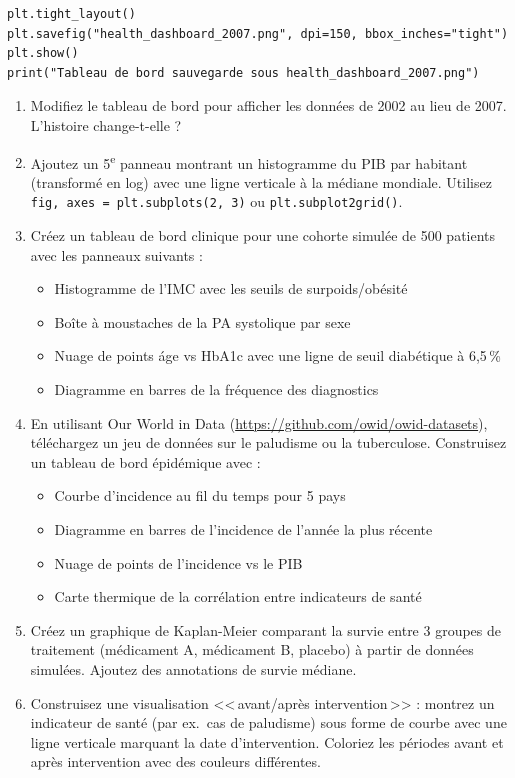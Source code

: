 \begin{verbatim}
plt.tight_layout()
plt.savefig("health_dashboard_2007.png", dpi=150, bbox_inches="tight")
plt.show()
print("Tableau de bord sauvegarde sous health_dashboard_2007.png")
\end{verbatim}

\begin{exercise}
\begin{enumerate}
  \item Modifiez le tableau de bord pour afficher les donn\'ees de 2002 au lieu de 2007. L'histoire change-t-elle ?
  \item Ajoutez un 5\textsuperscript{e} panneau montrant un histogramme du PIB par habitant (transform\'e en log) avec une ligne verticale \`a la m\'ediane mondiale. Utilisez \texttt{fig, axes = plt.subplots(2, 3)} ou \texttt{plt.subplot2grid()}.
  \item Cr\'eez un tableau de bord clinique pour une cohorte simul\'ee de 500 patients avec les panneaux suivants :
    \begin{itemize}
      \item Histogramme de l'IMC avec les seuils de surpoids/ob\'esit\'e
      \item Bo\^ite \`a moustaches de la PA systolique par sexe
      \item Nuage de points \'age vs HbA1c avec une ligne de seuil diab\'etique \`a 6,5\,\%
      \item Diagramme en barres de la fr\'equence des diagnostics
    \end{itemize}
  \item En utilisant Our World in Data (\url{https://github.com/owid/owid-datasets}), t\'el\'echargez un jeu de donn\'ees sur le paludisme ou la tuberculose. Construisez un tableau de bord \'epid\'emique avec :
    \begin{itemize}
      \item Courbe d'incidence au fil du temps pour 5 pays
      \item Diagramme en barres de l'incidence de l'ann\'ee la plus r\'ecente
      \item Nuage de points de l'incidence vs le PIB
      \item Carte thermique de la corr\'elation entre indicateurs de sant\'e
    \end{itemize}
  \item Cr\'eez un graphique de Kaplan-Meier comparant la survie entre 3 groupes de traitement (m\'edicament A, m\'edicament B, placebo) \`a partir de donn\'ees simul\'ees. Ajoutez des annotations de survie m\'ediane.
  \item Construisez une visualisation <<\,avant/apr\`es intervention\,>> : montrez un indicateur de sant\'e (par ex.\ cas de paludisme) sous forme de courbe avec une ligne verticale marquant la date d'intervention. Coloriez les p\'eriodes avant et apr\`es intervention avec des couleurs diff\'erentes.
\end{enumerate}
\end{exercise}

